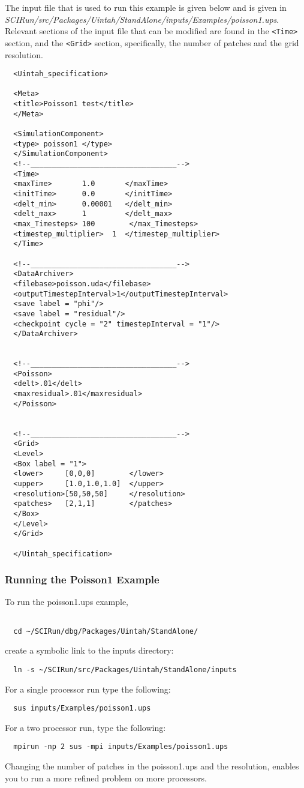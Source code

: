 \documentclass[11pt,fleqn]{book} %
\begin{document}
The input file that is used to run this example is given below and is
given in
\emph{SCIRun/src/Packages/Uintah/StandAlone/inputs/Examples/poisson1.ups}.
Relevant sections of the input file that can be modified are found in
the \texttt{<Time>} section, and the \texttt{<Grid>} section,
specifically, the number of patches and the grid resolution.

\begin{lstlisting}
  <Uintah_specification>

  <Meta>
  <title>Poisson1 test</title>
  </Meta>

  <SimulationComponent>
  <type> poisson1 </type>
  </SimulationComponent>
  <!--__________________________________-->
  <Time>
  <maxTime>       1.0       </maxTime>
  <initTime>      0.0       </initTime>
  <delt_min>      0.00001   </delt_min>
  <delt_max>      1         </delt_max>
  <max_Timesteps> 100        </max_Timesteps>
  <timestep_multiplier>  1  </timestep_multiplier>
  </Time>

  <!--__________________________________-->
  <DataArchiver>
  <filebase>poisson.uda</filebase>
  <outputTimestepInterval>1</outputTimestepInterval>
  <save label = "phi"/>
  <save label = "residual"/>
  <checkpoint cycle = "2" timestepInterval = "1"/>
  </DataArchiver>


  <!--__________________________________-->
  <Poisson>
  <delt>.01</delt>
  <maxresidual>.01</maxresidual>
  </Poisson>


  <!--__________________________________-->
  <Grid>
  <Level>
  <Box label = "1">
  <lower>     [0,0,0]        </lower>
  <upper>     [1.0,1.0,1.0]  </upper>
  <resolution>[50,50,50]     </resolution>
  <patches>   [2,1,1]        </patches>
  </Box>
  </Level>
  </Grid>

  </Uintah_specification>

\end{lstlisting}


\subsubsection{Running the Poisson1 Example}

To run the poisson1.ups example, 
\begin{lstlisting}

  cd ~/SCIRun/dbg/Packages/Uintah/StandAlone/
\end{lstlisting}

create a symbolic link to the inputs directory:
\begin{lstlisting}
  ln -s ~/SCIRun/src/Packages/Uintah/StandAlone/inputs
\end{lstlisting}
For a single processor run type the following:
\begin{lstlisting}
  sus inputs/Examples/poisson1.ups
\end{lstlisting}
For a two processor run, type the following:
\begin{lstlisting}
  mpirun -np 2 sus -mpi inputs/Examples/poisson1.ups
\end{lstlisting}
Changing the number of patches in the poisson1.ups and the resolution,
enables you to run a more refined problem on more processors.
\end{document}
